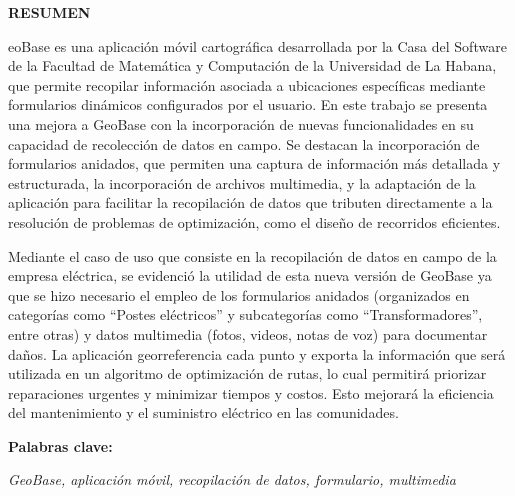 \documentclass[12pt, a4paper]{book}
\newenvironment{resumentesis}[1]{ %
  \clearpage
  \thispagestyle{empty}
  \begin{center}
    {\LARGE\bfseries RESUMEN} \\[1.5cm]
  \end{center}
  \setlength{\parskip}{1em} %
}{
  \vspace{1cm}
  \noindent
  \textbf{Palabras clave:} \\[0.3cm]
  \hspace*{1.5cm} %
  \begin{minipage}{0.8\textwidth}
    \textit{GeoBase, aplicación móvil, recopilación de datos, formulario, multimedia}
  \end{minipage}
  \newpage
}
\begin{document}
\begin{resumentesis}
  
  GeoBase es una aplicación móvil cartográfica desarrollada por la Casa del Software de la Facultad de Matemática y Computación de la Universidad de La Habana, que permite recopilar información asociada a ubicaciones específicas mediante formularios dinámicos configurados por el usuario. En este trabajo se presenta una mejora a GeoBase con la incorporación de nuevas funcionalidades en su capacidad de recolección de datos en campo. Se destacan la incorporación de formularios anidados, que permiten una captura de información más detallada y estructurada, la incorporación de archivos multimedia, y la adaptación de la aplicación para facilitar la recopilación de datos que tributen directamente a la resolución de problemas de optimización, como el diseño de recorridos eficientes. 

  Mediante el caso de uso que consiste en la recopilación de datos en campo de la empresa eléctrica, se evidenció la utilidad de esta nueva versión de GeoBase ya que se hizo necesario el empleo de los formularios anidados (organizados en categorías como “Postes eléctricos” y subcategorías como “Transformadores”, entre otras) y datos multimedia (fotos, videos, notas de voz) para documentar daños. La aplicación georreferencia cada punto y exporta la información que será utilizada en un algoritmo de optimización de rutas, lo cual permitirá priorizar reparaciones urgentes y minimizar tiempos y costos. Esto mejorará la eficiencia del mantenimiento y el suministro eléctrico en las comunidades.

\end{resumentesis}
\end{document}
